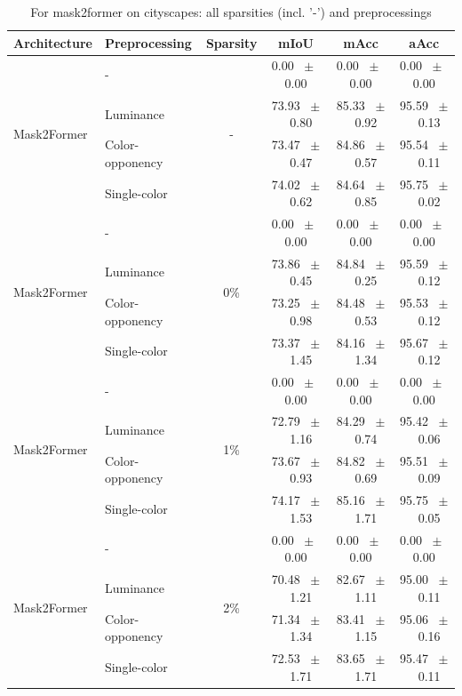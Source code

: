 \begin{table}[h]
  \centering
  \caption{For mask2former on cityscapes: all sparsities (incl. '-') and preprocessings}
  \begin{tabular}{@{}l l c c c c@{}}
    \toprule
    Architecture & Preprocessing & Sparsity & mIoU & mAcc & aAcc \\
    \midrule
    \multirow{4}{*}{Mask2Former} & - & \multirow{4}{*}{-} & 0.00 ~$\pm$~ 0.00 & 0.00 ~$\pm$~ 0.00 & 0.00 ~$\pm$~ 0.00 \\
    & Luminance &  & 73.93 ~$\pm$~ 0.80 & 85.33 ~$\pm$~ 0.92 & 95.59 ~$\pm$~ 0.13 \\
    & Color-opponency &  & 73.47 ~$\pm$~ 0.47 & 84.86 ~$\pm$~ 0.57 & 95.54 ~$\pm$~ 0.11 \\
    & Single-color &  & 74.02 ~$\pm$~ 0.62 & 84.64 ~$\pm$~ 0.85 & 95.75 ~$\pm$~ 0.02 \\
    \midrule
    \multirow{4}{*}{Mask2Former} & - & \multirow{4}{*}{0\%} & 0.00 ~$\pm$~ 0.00 & 0.00 ~$\pm$~ 0.00 & 0.00 ~$\pm$~ 0.00 \\
    & Luminance &  & 73.86 ~$\pm$~ 0.45 & 84.84 ~$\pm$~ 0.25 & 95.59 ~$\pm$~ 0.12 \\
    & Color-opponency &  & 73.25 ~$\pm$~ 0.98 & 84.48 ~$\pm$~ 0.53 & 95.53 ~$\pm$~ 0.12 \\
    & Single-color &  & 73.37 ~$\pm$~ 1.45 & 84.16 ~$\pm$~ 1.34 & 95.67 ~$\pm$~ 0.12 \\
    \midrule
    \multirow{4}{*}{Mask2Former} & - & \multirow{4}{*}{1\%} & 0.00 ~$\pm$~ 0.00 & 0.00 ~$\pm$~ 0.00 & 0.00 ~$\pm$~ 0.00 \\
    & Luminance &  & 72.79 ~$\pm$~ 1.16 & 84.29 ~$\pm$~ 0.74 & 95.42 ~$\pm$~ 0.06 \\
    & Color-opponency &  & 73.67 ~$\pm$~ 0.93 & 84.82 ~$\pm$~ 0.69 & 95.51 ~$\pm$~ 0.09 \\
    & Single-color &  & 74.17 ~$\pm$~ 1.53 & 85.16 ~$\pm$~ 1.71 & 95.75 ~$\pm$~ 0.05 \\
    \midrule
    \multirow{4}{*}{Mask2Former} & - & \multirow{4}{*}{2\%} & 0.00 ~$\pm$~ 0.00 & 0.00 ~$\pm$~ 0.00 & 0.00 ~$\pm$~ 0.00 \\
    & Luminance &  & 70.48 ~$\pm$~ 1.21 & 82.67 ~$\pm$~ 1.11 & 95.00 ~$\pm$~ 0.11 \\
    & Color-opponency &  & 71.34 ~$\pm$~ 1.34 & 83.41 ~$\pm$~ 1.15 & 95.06 ~$\pm$~ 0.16 \\
    & Single-color &  & 72.53 ~$\pm$~ 1.71 & 83.65 ~$\pm$~ 1.71 & 95.47 ~$\pm$~ 0.11 \\
    \midrule

\end{tabular}
\end{table}
